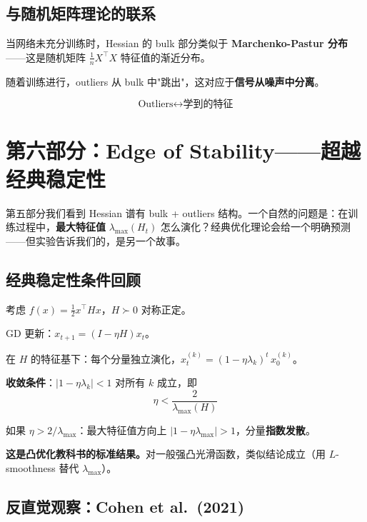 \documentclass[12pt, a4paper]{ctexart}
\begin{document}
\subsection{与随机矩阵理论的联系}

\begin{mathbox}
当网络未充分训练时，Hessian 的 bulk 部分类似于 \textbf{Marchenko-Pastur 分布}——这是随机矩阵 $\frac{1}{n}X^\top X$ 特征值的渐近分布。

随着训练进行，outliers 从 bulk 中"跳出"，这对应于\textbf{信号从噪声中分离}。

\[
\text{Outliers} \leftrightarrow \text{学到的特征}
\]
\end{mathbox}


\section{第六部分：Edge of Stability——超越经典稳定性}

第五部分我们看到 Hessian 谱有 bulk + outliers 结构。一个自然的问题是：在训练过程中，\textbf{最大特征值} $\lambda_{\max}(H_t)$ 怎么演化？经典优化理论会给一个明确预测——但实验告诉我们的，是另一个故事。

\subsection{经典稳定性条件回顾}

\begin{blackboard}[GD 在二次目标上的稳定性]

考虑 $f(x) = \frac{1}{2}x^\top H x$，$H \succ 0$ 对称正定。

GD 更新：$x_{t+1} = (I - \eta H) x_t$。

在 $H$ 的特征基下：每个分量独立演化，$x_t^{(k)} = (1 - \eta \lambda_k)^t\, x_0^{(k)}$。

\textbf{收敛条件}：$|1 - \eta \lambda_k| < 1$ 对所有 $k$ 成立，即
\[
\boxed{\eta < \frac{2}{\lambda_{\max}(H)}}
\]

如果 $\eta > 2/\lambda_{\max}$：最大特征值方向上 $|1 - \eta \lambda_{\max}| > 1$，分量\textbf{指数发散}。

\textbf{这是凸优化教科书的标准结果。}对一般强凸光滑函数，类似结论成立（用 $L$-smoothness 替代 $\lambda_{\max}$）。
\end{blackboard}

\subsection{反直觉观察：Cohen et al.\ (2021)}
\end{document}
